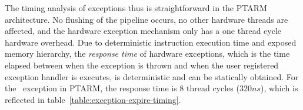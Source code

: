 The timing analysis of exceptions thus is straightforward in the PTARM architecture.
No flushing of the pipeline occurs, no other hardware threads are affected, and the hardware exception mechanism only has a one thread cycle hardware overhead.
Due to deterministic instruction execution time and exposed memory hierarchy, the \emph{response time} of hardware exceptions, which is the time elapsed between when the exception is thrown and when the user registered exception handler is executes, is deterministic and can be statically obtained. 
For the \timerexpired\ exception in PTARM, the response time is 8 thread cycles ($320ns$), which is reflected in table~\ref{table:exception-expire-timing}.


